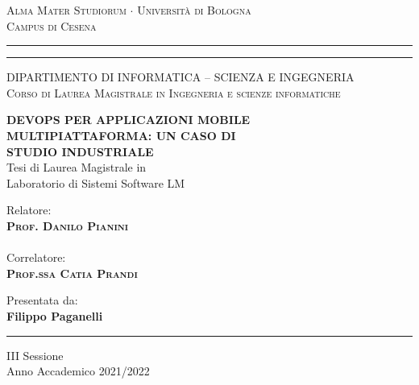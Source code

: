 \documentclass[12pt,a4paper]{report}
\begin{document}
  
\begin{titlepage}
\begin{center}
{{\Large{\textsc{Alma Mater Studiorum $\cdot$ Universit\`a di
Bologna\\\vspace{2mm}Campus di Cesena}}}} 
\rule[0.1cm]{15.8cm}{0.1mm}
\rule[0.5cm]{15.8cm}{0.6mm}

{\small{\textsc { DIPARTIMENTO DI INFORMATICA – SCIENZA E INGEGNERIA \\
\vspace{3mm}
Corso di Laurea Magistrale in Ingegneria e scienze informatiche}}}
\end{center}
\vspace{15mm}
\begin{center}
{\LARGE\textbf{DEVOPS PER APPLICAZIONI MOBILE}} \\
\vspace{3mm}
{\LARGE\textbf{MULTIPIATTAFORMA: UN CASO DI}} \\
\vspace{3mm}
{\LARGE\textbf{STUDIO INDUSTRIALE}} \\
\vspace{20mm} {\large{\sc Tesi di Laurea Magistrale in\\ Laboratorio di Sistemi Software LM}}
\end{center}
\vfill
\par
\noindent

\begin{minipage}[t]{0.47\textwidth}
{\large{\sc Relatore:}\\
{\bf \textsc{Prof. Danilo Pianini}}}\\ \\
{\large{\sc Correlatore:}\\
{\bf \textsc{Prof.ssa Catia Prandi}}}\\
\vskip 8pt
\end{minipage}
\hfill
\begin{minipage}[t]{0.47\textwidth}\raggedleft
{\large{\sc Presentata da:}\\
{\bf Filippo Paganelli}}
\end{minipage}
\vspace{20mm}
\begin{center}
\rule[0.1cm]{15.8cm}{0.2mm}
{\large{\sc III Sessione\\
Anno Accademico 2021/2022}}
\end{center}
\end{titlepage}
\end{document}
